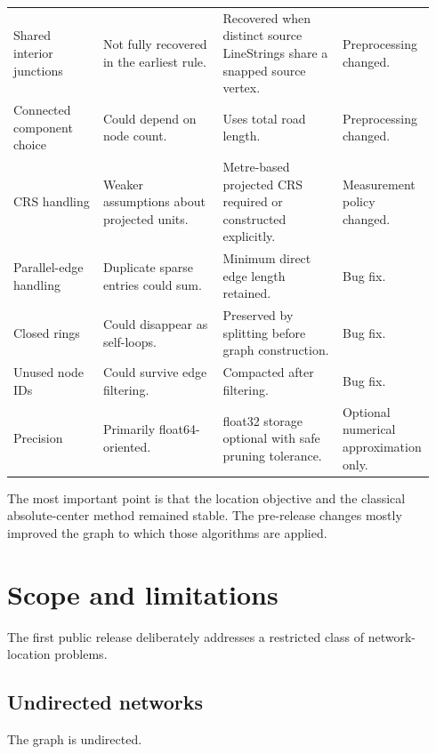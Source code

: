 \documentclass[11pt]{article}
\begin{document}
\begin{longtable}{p{0.21\linewidth}p{0.29\linewidth}p{0.29\linewidth}p{0.15\linewidth}}
Shared interior junctions
&
Not fully recovered in the earliest rule.
&
Recovered when distinct source LineStrings share a snapped source vertex.
&
Preprocessing changed.
\\
\addlinespace

Connected component choice
&
Could depend on node count.
&
Uses total road length.
&
Preprocessing changed.
\\
\addlinespace

CRS handling
&
Weaker assumptions about projected units.
&
Metre-based projected CRS required or constructed explicitly.
&
Measurement policy changed.
\\
\addlinespace

Parallel-edge handling
&
Duplicate sparse entries could sum.
&
Minimum direct edge length retained.
&
Bug fix.
\\
\addlinespace

Closed rings
&
Could disappear as self-loops.
&
Preserved by splitting before graph construction.
&
Bug fix.
\\
\addlinespace

Unused node IDs
&
Could survive edge filtering.
&
Compacted after filtering.
&
Bug fix.
\\
\addlinespace

Precision
&
Primarily float64-oriented.
&
float32 storage optional with safe pruning tolerance.
&
Optional numerical approximation only.
\\

\bottomrule
\end{longtable}

\normalsize

The most important point is that the location objective and the classical
absolute-center method remained stable. The pre-release changes mostly improved
the graph to which those algorithms are applied.

\section{Scope and limitations}

The first public release deliberately addresses a restricted class of
network-location problems.

\subsection{Undirected networks}

The graph is undirected.
\end{document}
